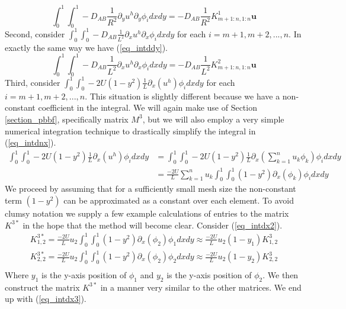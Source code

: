 \documentclass[11pt,fleqn]{article}
\theoremstyle{defstyle}
\begin{document}
\begin{equation}
\int_0^1 \int_0^1 -D_{AB}\frac{1}{R^2}\partial_y u^h \partial_y \phi_i dxdy = -D_{AB}\frac{1}{R^2}K^1_{m+1:n, 1:n}\mathbf{u}
\label{eq_intddx2}
\end{equation}
Second, consider $\int_0^1 \int_0^1  -D_{AB}\frac{1}{L^2}\partial_x u^h \partial_x \phi_i dxdy$ for each $i=m+1, m+2,...,n$. In exactly the same way we have (\ref{eq_intddy}). 
\begin{equation}
\int_0^1 \int_0^1  -D_{AB}\frac{1}{L^2}\partial_x u^h \partial_x \phi_i dxdy = -D_{AB}\frac{1}{L^2}K^2_{m+1:n, 1:n}\mathbf{u}
\label{eq_intddy}
\end{equation}
Third, consider $\int_0^1 \int_0^1 - 2U(1-y^2)\frac{1}{L}\partial_x(u^h)  \phi_idxdy$ for each $i=m+1, m+2,...,n$. This situation is slightly different because we have a non-constant coefficient in the integral. We will again make use of Section \ref{section_pbbf}, specifically matrix $M^3$, but we will also employ a very simple numerical integration technique to drastically simplify the integral in (\ref{eq_intdnx}).
\begin{equation}
\begin{aligned}
\int_0^1 \int_0^1 - 2U(1-y^2)\frac{1}{L}\partial_x(u^h)  \phi_idxdy &= \int_0^1 \int_0^1 - 2U(1-y^2)\frac{1}{L}\partial_x(\sum^n_{k=1} u_k \phi_k)  \phi_idxdy \\
& = \frac{-2U}{L}\sum^n_{k=1} u_k \int_0^1 \int_0^1 (1-y^2) \partial_x(\phi_k)  \phi_idxdy
\end{aligned}
\label{eq_intdnx}
\end{equation}
We proceed by assuming that for a sufficiently small mesh size the non-constant term $(1-y^2)$ can be approximated as a constant over each element. To avoid clumsy notation we supply a few example calculations of entries to the matrix $K^{3*}$ in the hope that the method will become clear. Consider (\ref{eq_intdx2}). 
\begin{equation}
\begin{aligned}
K^{3*}_{1,2} = \frac{-2U}{L} u_2 \int_0^1 \int_0^1 (1-y^2) \partial_x(\phi_2)  \phi_1dxdy \approx \frac{-2U}{L} u_2 (1-y_1)K^3_{1,2} \\
K^{3*}_{2,2} = \frac{-2U}{L} u_2 \int_0^1 \int_0^1 (1-y^2) \partial_x(\phi_2)  \phi_2dxdy \approx \frac{-2U}{L} u_2 (1-y_2)K^3_{2,2} \\ 
\end{aligned}
\label{eq_intdx2}
\end{equation}
Where $y_1$ is the y-axis position of $\phi_1$ and $y_2$ is the y-axis position of $\phi_2$. We then construct the matrix $K^{3*}$ in a manner very similar to the other matrices. We end up with (\ref{eq_intdx3}).
\end{document}
